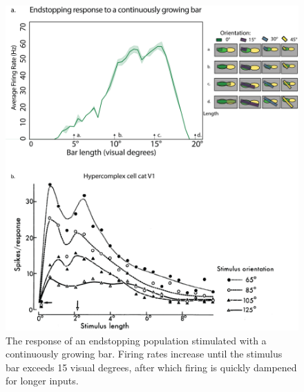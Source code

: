 \documentclass[12pt]{article}
\begin{document}
  \begin{figure}[H]
    \centering
    \includegraphics[width=1.0 \textwidth]{adjusted_figures/endstop_line_length_physiology.png}
    \caption{The response of an endstopping population stimulated with a continuously growing bar. Firing rates increase until the stimulus bar exceeds 15 visual degrees, after which firing is quickly dampened for longer inputs.}
    \label{fig:endstopping_length}
  \end{figure}
\end{document}
